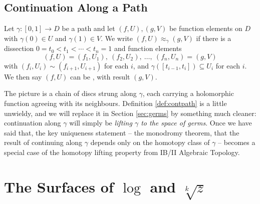 \subsection{Continuation Along a Path}

\begin{definition}\label{def:contpath}
	Let $\gamma : [0,1] \to D$ be a path and let $(f, U), (g, V)$ be function elements on
	$D$ with $\gamma(0) \in U$ and $\gamma(1) \in V$. We write $(f, U) \approx_\gamma (g,V)$
	if there is a dissection $0 = t_0 < t_1 < \cdots < t_n = 1$ and function elements
	$$
	(f, U) = (f_1, U_1), \ (f_2, U_2), \ \dots, \ (f_n, U_n) = (g, V)
	$$
	with $(f_i, U_i) \sim (f_{i+1}, U_{i+1})$ for each $i$, and
	$\gamma([t_{i-1}, t_i]) \subseteq U_i$ for each $i$. We then say $(f,U)$ can be
	, with result $(g,V)$.
\end{definition}

\begin{center}
\end{center}

The picture is a chain of discs strung along $\gamma$, each carrying a holomorphic
function agreeing with its neighbours. Definition \ref{def:contpath} is a little
unwieldy, and we will replace it in Section \ref{sec:germs} by something much cleaner:
continuation along $\gamma$ will simply be \emph{lifting $\gamma$ to the space of germs}.
Once we have said that, the key uniqueness statement -- the monodromy theorem, that the
result of continuing along $\gamma$ depends only on the homotopy class of $\gamma$ --
becomes a special case of the homotopy lifting property from IB/II Algebraic Topology.

\section{The Surfaces of $\log$ and $\sqrt[k]{z}$}\label{sec:logsurface}

